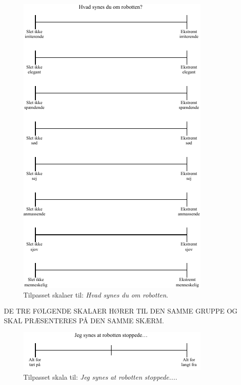 %
\begin{figure}[H]
\centering
\includegraphics[width =\textwidth]{Figure/TilpasningAfSkalaer/HvadSynesDuOmR} 
\caption{Tilpasset skalaer til: \textit{Hvad synes du om robotten}.}
\label{fig:TilpasningHvadSynesDuOmR}
\end{figure}
\noindent
%
DE TRE FØLGENDE SKALAER HØRER TIL DEN SAMME GRUPPE OG SKAL PRÆSENTERES PÅ DEN SAMME SKÆRM.
%
\begin{figure}[H]
\centering
\includegraphics[width =\textwidth]{Figure/TilpasningAfSkalaer/TilpassetRStoppede} 
\caption{Tilpasset skala til: \textit{Jeg synes at robotten stoppede...}.}
\label{fig:TilpasningRStoppede}
\end{figure}
\noindent
%

